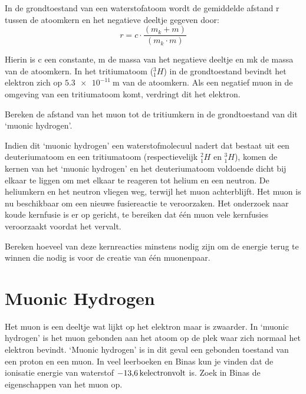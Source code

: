 \begin{questions}
 In de grondtoestand van een waterstofatoom wordt de gemiddelde afstand r 
 tussen de atoomkern en het negatieve deeltje gegeven door: 
\begin{equation}
    r = c \cdot \frac{ (m_k + m)}{(m_k \cdot m)}
\end{equation}

Hierin is c een constante, m de massa van het negatieve deeltje en mk de 
massa van de atoomkern. In het tritiumatoom ($^3_1H$) in de grondtoestand bevindt 
het elektron zich op $\SI{5,3e-11}{\meter}$ van de atoomkern.
Als een negatief muon in de omgeving van een tritiumatoom komt, verdringt 
dit het elektron.

\question
Bereken de afstand van het muon tot de tritiumkern in de grondtoestand van dit `muonic hydrogen'.
\begin{solution} 
 
\end{solution} 


Indien dit `muonic hydrogen' een waterstofmolecuul nadert dat bestaat uit een
deuteriumatoom en een tritiumatoom (respectievelijk $^2_1H$ en $^3_1H$), komen de
kernen van het `muonic hydrogen' en het deuteriumatoom voldoende dicht bij elkaar
te liggen om met elkaar te reageren tot helium en een neutron. De
heliumkern en het neutron vliegen weg, terwijl het muon achterblijft.
Het muon is nu beschikbaar om een nieuwe fusiereactie te veroorzaken.
Het onderzoek naar koude kernfusie is er op gericht, te bereiken dat één
muon vele kernfusies veroorzaakt voordat het vervalt.

\question 

Bereken hoeveel van deze kernreacties minstens nodig zijn om de energie 
terug te winnen die nodig is voor de creatie van één muonenpaar.
\begin{solution} 
 
\end{solution} 

\section{Muonic Hydrogen}

Het muon is een deeltje wat lijkt op het elektron maar is zwaarder. 
In `muonic hydrogen' is het muon gebonden aan het atoom op de plek waar zich normaal het elektron bevindt.
`Muonic hydrogen' is in dit geval een gebonden toestand van een proton en een muon. 
In veel leerboeken en Binas kun je vinden dat de ionisatie energie van waterstof $\SI{-13,6}{\kilo\\electronvolt}$ is.
\question
Zoek in Binas de eigenschappen van het muon op.


\end{questions}
